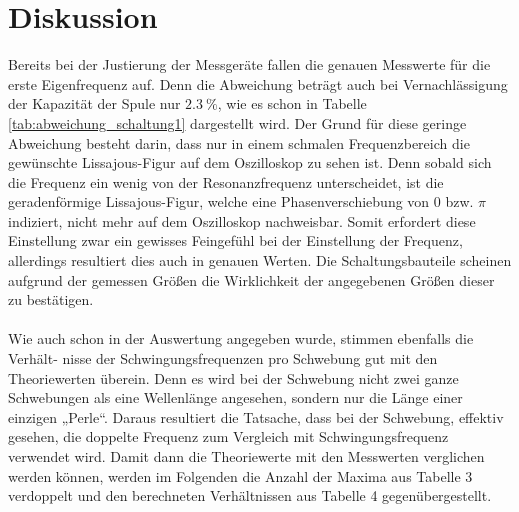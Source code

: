 \section{Diskussion}
\label{sec:Diskussion}

Bereits bei der Justierung der Messgeräte fallen die genauen Messwerte für die erste
Eigenfrequenz auf. Denn die Abweichung beträgt auch bei Vernachlässigung der Kapazität
der Spule nur  $\qty{2.3}{\percent}$, wie es schon in Tabelle \ref{tab:abweichung_schaltung1}
dargestellt wird. Der Grund für diese geringe Abweichung besteht darin, dass nur in einem
schmalen Frequenzbereich die gewünschte Lissajous-Figur auf dem Oszilloskop zu sehen ist. 
Denn sobald sich die Frequenz ein wenig von der Resonanzfrequenz unterscheidet, ist die geradenförmige
Lissajous-Figur, welche eine Phasenverschiebung von 0 bzw. $\pi$ indiziert, nicht mehr
auf dem Oszilloskop nachweisbar. Somit erfordert diese Einstellung zwar ein gewisses
Feingefühl bei der Einstellung der Frequenz, allerdings resultiert dies auch in genauen
Werten. Die Schaltungsbauteile scheinen aufgrund der gemessen Größen die Wirklichkeit
der angegebenen Größen dieser zu bestätigen.\\
\\
Wie auch schon in der Auswertung angegeben wurde, stimmen ebenfalls die Verhält-
nisse der Schwingungsfrequenzen pro Schwebung gut mit den Theoriewerten überein.
Denn es wird bei der Schwebung nicht zwei ganze Schwebungen als eine Wellenlänge
angesehen, sondern nur die Länge einer einzigen „Perle“. Daraus resultiert die Tatsache,
dass bei der Schwebung, effektiv gesehen, die doppelte Frequenz zum Vergleich mit
Schwingungsfrequenz verwendet wird. Damit dann die Theoriewerte mit den Messwerten
verglichen werden können, werden im Folgenden die Anzahl der Maxima aus Tabelle 3
verdoppelt und den berechneten Verhältnissen aus Tabelle 4 gegenübergestellt.